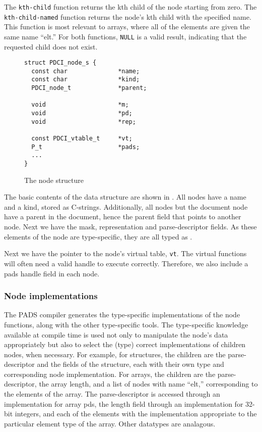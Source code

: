 The {\tt kth-child} function returns the kth child of the node
starting from zero. The {\tt kth-child-named} function returns the node's kth
child with the specified name. This function is most relevant to
arrays, where all of the elements are given the same name ``elt.''
For both functions, {\tt NULL} is a valid result, indicating that the
requested child does not exist.

\begin{figure}
{\small
\begin{verbatim}
struct PDCI_node_s {
  const char              *name;
  const char              *kind;
  PDCI_node_t             *parent;

  void                    *m;
  void                    *pd;
  void                    *rep;

  const PDCI_vtable_t     *vt;
  P_t                     *pads;
  ...
}
\end{verbatim}
}
\caption{The node structure}
\label{fig:node-struct}
\end{figure}

The basic contents of the  data structure are shown in
. All nodes have a name and a kind, stored as
C-strings. Additionally, all nodes but the document node have a parent
in the document, hence the parent field that points to another node.
Next we have the mask, representation and parse-descriptor fields. As
these elements of the node are type-specific, they are all typed as
\vptr.

Next we have the pointer to the node's virtual table, {\tt vt}. The
virtual functions will often need a valid \pads handle to execute
correctly. Therefore, we also include a pads handle field in each
node.

\subsubsection{Node implementations}
The PADS compiler generates the type-specific implementations of the
node functions, along with the other type-specific tools.  The
type-specific knowledge available at compile time is used not only to
manipulate the node's data appropriately but also to select the (type)
correct implementations of children nodes, when necessary.  For
example, for structures, the children are the parse-descriptor and the
fields of the structure, each with their own type and corresponding
node implementation.  For arrays, the children are the
parse-descriptor, the array length, and a list of nodes with name
``elt,'' corresponding to the elements of the array. The
parse-descriptor is accessed through an implementation for array pds,
the length field through an implementation for 32-bit integers, and
each of the elements with the implementation appropriate to the
particular element type of the array. Other datatypes are analagous.

